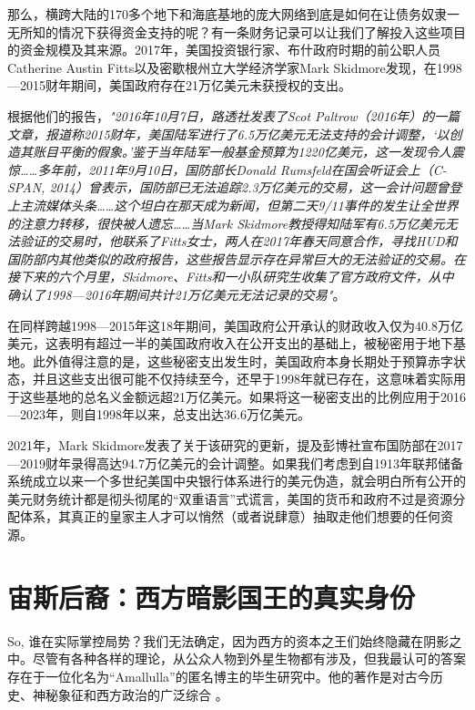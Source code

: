 \documentclass[10pt,twocolumn,letterpaper]{article}
\begin{document}
那么，横跨大陆的170多个地下和海底基地的庞大网络到底是如何在让债务奴隶一无所知的情况下获得资金支持的呢？有一条财务记录可以让我们了解投入这些项目的资金规模及其来源。2017年，美国投资银行家、布什政府时期的前公职人员Catherine Austin Fitts以及密歇根州立大学经济学家Mark Skidmore发现，在1998—2015财年期间，美国政府存在21万亿美元未获授权的支出\cite{11,12,13}。

根据他们的报告，\textit{"2016年10月7日，路透社发表了Scot Paltrow（2016年）的一篇文章，报道称2015财年，美国陆军进行了6.5万亿美元无法支持的会计调整，‘以创造其账目平衡的假象。’鉴于当年陆军一般基金预算为1220亿美元，这一发现令人震惊……多年前，2011年9月10日，国防部长Donald Rumsfeld在国会听证会上（C-SPAN, 2014）曾表示，国防部已无法追踪2.3万亿美元的交易，这一会计问题曾登上主流媒体头条……这个坦白在那天成为新闻，但第二天9/11事件的发生让全世界的注意力转移，很快被人遗忘……当Mark Skidmore教授得知陆军有6.5万亿美元无法验证的交易时，他联系了Fitts女士，两人在2017年春天同意合作，寻找HUD和国防部内其他类似的政府报告，这些报告显示存在异常巨大的无法验证的交易。在接下来的六个月里，Skidmore、Fitts和一小队研究生收集了官方政府文件，从中确认了1998—2016年期间共计21万亿美元无法记录的交易"}\cite{12}。

在同样跨越1998—2015年这18年期间，美国政府公开承认的财政收入仅为40.8万亿美元\cite{15}，这表明有超过一半的美国政府收入在公开支出的基础上，被秘密用于地下基地。此外值得注意的是，这些秘密支出发生时，美国政府本身长期处于预算赤字状态，并且这些支出很可能不仅持续至今，还早于1998年就已存在，这意味着实际用于这些基地的总名义金额远超21万亿美元。如果将这一秘密支出的比例应用于2016—2023年，则自1998年以来，总支出达36.6万亿美元。

2021年，Mark Skidmore发表了关于该研究的更新，提及彭博社宣布国防部在2017—2019财年录得高达94.7万亿美元的会计调整\cite{17,18}。如果我们考虑到自1913年联邦储备系统成立以来一个多世纪美国中央银行体系进行的美元伪造\cite{37}，就会明白所有公开的美元财务统计都是彻头彻尾的“双重语言”式谎言，美国的货币和政府不过是资源分配体系，其真正的皇家主人才可以悄然（或者说肆意）抽取走他们想要的任何资源。

\section{宙斯后裔：西方暗影国王的真实身份}
So, 谁在实际掌控局势？我们无法确定，因为西方的资本之王们始终隐藏在阴影之中。尽管有各种各样的理论，从公众人物到外星生物都有涉及，但我最认可的答案存在于一位化名为“Amallulla”的匿名博主的毕生研究中。他的著作是对古今历史、神秘象征和西方政治的广泛综合 \cite{33,34}。
\end{document}

